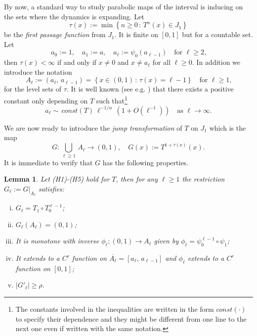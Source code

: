 \documentclass[11pt]{amsart}
\newtheorem{lemma}[theorem]{Lemma}
\theoremstyle{definition}
\theoremstyle{remark}
\theoremstyle{definition}
\numberwithin{equation}{section}
\newcommand{\set}[1]{\left\{#1\right\}}
\begin{document}
By now, a standard way to study parabolic maps of the interval is inducing on the sets where the dynamics is expanding. Let
\begin{equation}\label{tau-function}
\tau(x) := \min \set{n\ge 0\, :\, T^n(x) \in J_1}
\end{equation}
be the \emph{first passage function} from $J_1$. It is finite on $[0,1]$ but for a countable set. Let 
\[
a_0:=1,\quad a_1:= a,\quad a_\ell := \psi_0(a_{\ell-1})\quad \text{for $\ell\ge 2$,}
\]
then $\tau(x) <\infty$ if and only if $x\not=0$ and $x \not= a_\ell$ for all $\ell\ge 0$. In addition we introduce the notation
\[
A_\ell := (a_\ell,\, a_{\ell-1}) = \set{x\in (0,1)\, :\, \tau(x) = \ell-1}\quad \text{for $\ell\ge 1$,}
\]
for the level sets of $\tau$. It is well known (see e.g. \cite[Lemma 2.1]{Is0}) that there exists a positive constant only depending on $T$ such that\footnote{The constants involved in the inequalities are written in the form $const(\cdot)$ to specify their dependence and they might be different from one line to the next one even if written with the same notation.}
\begin{equation}\label{asintotica-al}
a_\ell \sim \, const(T)\ \ell^{-1/\alpha}\, (1+O(\ell^{-1}))\quad \text{as $\ell \to \infty$.}
\end{equation}

We are now ready to introduce the \emph{jump transformation} of $T$ on $J_1$ which is the map
\[
G: \bigcup_{\ell\ge 1}\, A_\ell \to (0,1),\quad G(x) := T^{1+\tau(x)}(x).
\]
It is immediate to verify that $G$ has the following properties.
\begin{lemma}\label{lem:prop-jt}
Let (H1)-(H5) hold for $T$, then for any $\ell \ge 1$ the restriction $G_\ell := G|_{A_\ell}$ satisfies:
\begin{enumerate}[(i)]
\item $G_\ell = T_1 \circ T_0^{\ell-1}$;
\item $G_\ell(A_\ell) = (0,1)$;
\item It is monotone with inverse $\phi_\ell : (0,1) \to A_\ell$ given by $\phi_\ell = \psi_0^{\ell-1} \circ \psi_1$;
\item It extends to a $C^r$ function on $\overline{A_\ell} = [a_\ell,\, a_{\ell-1}]$ and $\phi_\ell$ extends to a $C^r$ function on $[0,1]$;
\item $|G'_\ell|\ge \rho$.
\end{enumerate}
\end{lemma}
\end{document}
